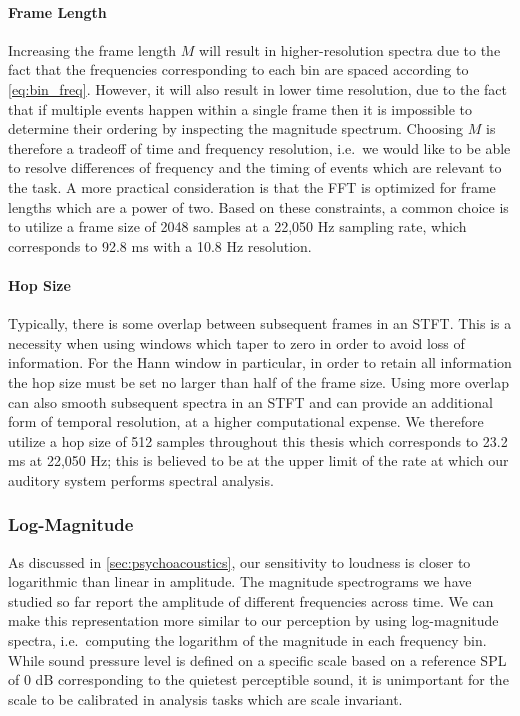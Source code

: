 \paragraph{Frame Length}

Increasing the frame length $M$ will result in higher-resolution spectra due to the fact that the frequencies corresponding to each bin are spaced according to \cref{eq:bin_freq}.
However, it will also result in lower time resolution, due to the fact that if multiple events happen within a single frame then it is impossible to determine their ordering by inspecting the magnitude spectrum.
Choosing $M$ is therefore a tradeoff of time and frequency resolution, i.e.\ we would like to be able to resolve differences of frequency and the timing of events which are relevant to the task.
A more practical consideration is that the FFT is optimized for frame lengths which are a power of two.
Based on these constraints, a common choice is to utilize a frame size of 2048 samples at a 22,050 Hz sampling rate, which corresponds to 92.8 ms with a 10.8 Hz resolution.

\paragraph{Hop Size}

Typically, there is some overlap between subsequent frames in an STFT.
This is a necessity when using windows which taper to zero in order to avoid loss of information.
For the Hann window in particular, in order to retain all information the hop size must be set no larger than half of the frame size.
Using more overlap can also smooth subsequent spectra in an STFT and can provide an additional form of temporal resolution, at a higher computational expense.
We therefore utilize a hop size of 512 samples throughout this thesis which corresponds to 23.2 ms at 22,050 Hz; this is believed to be at the upper limit of the rate at which our auditory system performs spectral analysis.

\subsubsection{Log-Magnitude}

As discussed in \cref{sec:psychoacoustics}, our sensitivity to loudness is closer to logarithmic than linear in amplitude.
The magnitude spectrograms we have studied so far report the amplitude of different frequencies across time.
We can make this representation more similar to our perception by using log-magnitude spectra, i.e.\ computing the logarithm of the magnitude in each frequency bin.
While sound pressure level is defined on a specific scale based on a reference SPL of 0 dB corresponding to the quietest perceptible sound, it is unimportant for the scale to be calibrated in analysis tasks which are scale invariant.

